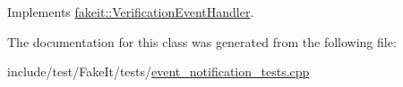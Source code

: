 Implements \mbox{\hyperlink{structfakeit_1_1VerificationEventHandler_a826b9d15e23bad7013b219d8e45ef1d0}{fakeit\+::\+Verification\+Event\+Handler}}.



The documentation for this class was generated from the following file\+:\begin{DoxyCompactItemize}
\item 
include/test/\+Fake\+It/tests/\mbox{\hyperlink{event__notification__tests_8cpp}{event\+\_\+notification\+\_\+tests.\+cpp}}\end{DoxyCompactItemize}
